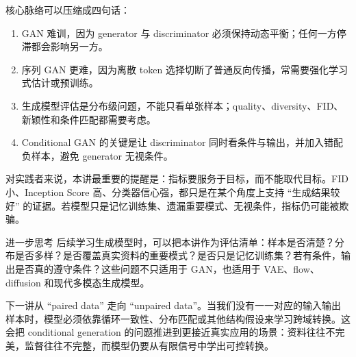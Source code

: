\documentclass[a4paper]{article}
\begin{document}
核心脉络可以压缩成四句话：

\begin{enumerate}
    \item GAN 难训，因为 generator 与 discriminator 必须保持动态平衡；任何一方停滞都会影响另一方。
    \item 序列 GAN 更难，因为离散 token 选择切断了普通反向传播，常需要强化学习式估计或预训练。
    \item 生成模型评估是分布级问题，不能只看单张样本；quality、diversity、FID、新颖性和条件匹配都需要考虑。
    \item Conditional GAN 的关键是让 discriminator 同时看条件与输出，并加入错配负样本，避免 generator 无视条件。
\end{enumerate}

对实践者来说，本讲最重要的提醒是：指标要服务于目标，而不能取代目标。FID 小、Inception Score 高、分类器信心强，都只是在某个角度上支持 ``生成结果较好'' 的证据。若模型只是记忆训练集、遗漏重要模式、无视条件，指标仍可能被欺骗。

\begin{knowledgebox}{进一步思考}
    后续学习生成模型时，可以把本讲作为评估清单：样本是否清楚？分布是否多样？是否覆盖真实资料的重要模式？是否只是记忆训练集？若有条件，输出是否真的遵守条件？这些问题不只适用于 GAN，也适用于 VAE、flow、diffusion 和现代多模态生成模型。
\end{knowledgebox}

下一讲从 ``paired data'' 走向 ``unpaired data''。当我们没有一一对应的输入输出样本时，模型必须依靠循环一致性、分布匹配或其他结构假设来学习跨域转换。这会把 conditional generation 的问题推进到更接近真实应用的场景：资料往往不完美，监督往往不完整，而模型仍要从有限信号中学出可控转换。
\end{document}
